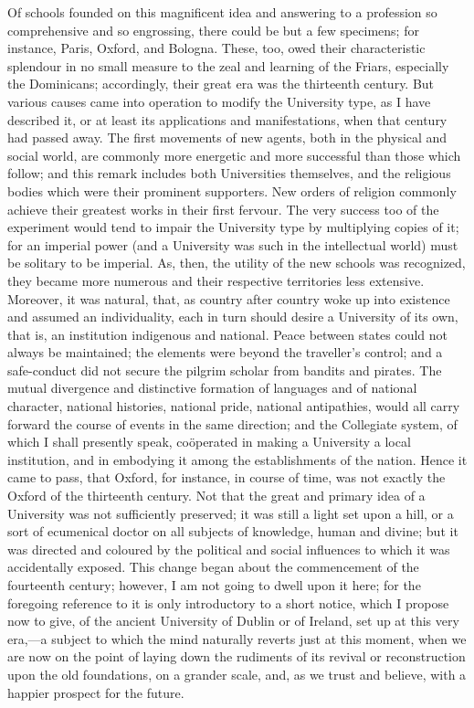 Of schools founded on this
magnificent idea and answering to a profession so comprehensive and so
engrossing, there could be but a few specimens; for instance, Paris,
Oxford, and Bologna. These, too, owed their characteristic splendour
in no small measure to the zeal and learning of the Friars, especially
the Dominicans; accordingly, their great era was the thirteenth
century. But various causes came into operation to modify the
University type, as I have described it, or at least its applications
and manifestations, when that century had passed away. The first
movements of new agents, both in the physical and social world, are
commonly more energetic and more successful than those which follow;
and this remark includes both Universities themselves, and the
religious bodies which were their prominent supporters. New orders of
religion commonly achieve their greatest works in their first fervour.
The very success too of the experiment would tend to impair the
University type by multiplying copies of it; for an imperial power
(and a University was such in the intellectual world) must be solitary
to be imperial. As, then, the utility of the new schools was
recognized, they became more numerous and their respective territories
less extensive. Moreover, it was natural, that, as country after
country woke up into existence and assumed an individuality, each in
turn should desire a University of its own, that is, an institution
indigenous and national. Peace between states could not always be
maintained; the elements were beyond the traveller's control; and a
safe-conduct did not secure the pilgrim scholar from bandits and
pirates. The mutual divergence and distinctive formation of languages
and of national character, national histories, national pride,
national antipathies, would all carry forward the course of events in
the same direction; and the Collegiate system, of which I shall
presently speak, coöperated in making a University a local
institution, and in embodying it among the establishments of the
nation. Hence it came to pass, that Oxford, for instance, in course of
time, was not exactly the Oxford of the thirteenth century. Not that
the great and primary idea of a University was not sufficiently
preserved; it was still a light set upon a hill, or a sort of
ecumenical doctor on all subjects of knowledge, human and divine; but
it was directed and coloured by the political and social influences to
which it was accidentally exposed. This change began about the
commencement of the fourteenth century; however, I am not going to
dwell upon it here; for the foregoing reference to it is only
introductory to a short notice, which I propose now to give, of the
ancient University of Dublin or of Ireland, set up at this very
era,—a subject to which the mind naturally reverts just at this
moment, when we are now on the point of laying down the rudiments of
its revival or reconstruction upon the old foundations, on a grander
scale, and, as we trust and believe, with a happier prospect for the
future.


